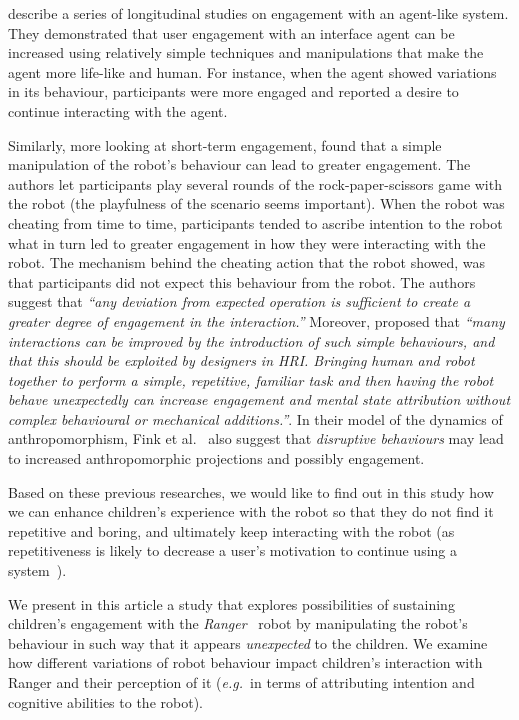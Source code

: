 \documentclass{sig-alternate}
\newcommand{\eg}{{\textit{e.g.~}}}
\begin{document}
\cite{bickmore_maintaining_2010} describe a series of longitudinal studies on
engagement with an agent-like system. They demonstrated that user engagement
with an interface agent can be increased using relatively simple techniques and
manipulations that make the agent more life-like and human. For instance, when
the agent showed variations in its behaviour, participants were more engaged and
reported a desire to continue interacting with the agent.

Similarly, more looking at short-term engagement, \cite{short_no_2010} found
that a simple manipulation of the robot's behaviour can lead to greater
engagement. The authors let participants play several rounds of the
rock-paper-scissors game with the robot (the playfulness of the scenario seems
important). When the robot was cheating from time to time, participants tended
to ascribe intention to the robot what in turn led to greater engagement in how
they were interacting with the robot. The mechanism behind the cheating action
that the robot showed, was that participants did not expect this behaviour from
the robot. The authors suggest that \textit{``any deviation from expected
    operation is sufficient to create a greater degree of engagement in the
interaction.''} Moreover, \cite[p.~225]{short_no_2010} proposed that
\textit{``many interactions can be improved by the introduction of such simple
    behaviours, and that this should be exploited by designers in HRI. Bringing
    human and robot together to perform a simple, repetitive, familiar task and
then having the robot behave unexpectedly can increase engagement and mental
state attribution without complex behavioural or mechanical additions.''}.
In their model of the dynamics of anthropomorphism, Fink et
al.~\cite{fink2014dynamics} also suggest that \emph{disruptive behaviours}
may lead to increased anthropomorphic projections and possibly engagement.

Based on these previous researches, we would like to find out in this study how
we can enhance children's experience with the robot so that they do not find it
repetitive and boring, and ultimately keep interacting with the robot (as
repetitiveness is likely to decrease a user's motivation to continue using a
system~\cite{bickmore_establishing_2005}).

We present in this article a study that explores possibilities of sustaining
children's engagement with the \emph{Ranger}~\cite{mondada2014ranger} robot by
manipulating the robot's behaviour in such way that it appears
\textit{unexpected} to the children. We examine how different variations of
robot behaviour impact children's interaction with Ranger and their perception of
it (\eg in terms of attributing intention and cognitive abilities to the robot).
\end{document}
